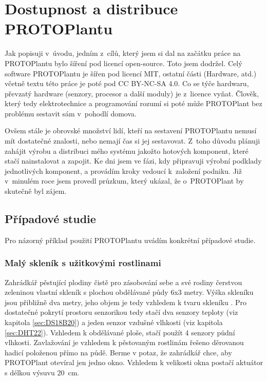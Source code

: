 \chapter{Dostupnost a distribuce PROTOPlantu}
Jak popisuji v~úvodu, jedním z~cílů, který jsem si dal na začátku práce na PROTOPlantu bylo šíření pod licencí open-source.
Toto jsem dodržel. 
Celý software PROTOPlantu je šířen pod licencí MIT, ostatní části (Hardware, atd.) včetně textu této práce je poté pod CC BY-NC-SA 4.0.
Co se týče hardwaru, převzatý hardware (senzory, procesor a další moduly) je z~licence vyňat.
Člověk, který tedy elektrotechnice a programování rozumí si poté může PROTOPlant bez problému sestavit sám v~pohodlí domova.

Ovšem stále je obrovské množství lidí, kteří na sestavení PROTOPlantu nemusí mít dostatečné znalosti, nebo nemají čas si jej sestavovat.
Z~toho důvodu plánuji zahájit výrobu a distribuci mého systému jakožto hotových komponent, které stačí nainstalovat a zapojit.
Ke dni  jsem ve fázi, kdy připravuji výrobní podklady jednotlivých komponent, a provádím kroky vedoucí k~založení podniku.
Již v~minulém roce jsem provedl průzkum, který ukázal, že o~PROTOPlant by skutečně byl zájem.

\section{Případové studie}
Pro názorný příklad použití PROTOPlantu uvádím konkrétní případové studie.

\subsection{Malý skleník s užitkovými rostlinami}
Zahrádkář pěstující plodiny čistě pro zásobování sebe a své rodiny čerstvou zeleninou vlastní skleník s plochou obdělávané půdy 6x3 metry.
Výška skleníku jsou přibližně dva metry, jeho objem je tedy vzhledem k tvaru skleníku .
Pro dostatečné pokrytí prostoru senzorikou tedy stačí dva senzory teploty (viz kapitola \ref{sec:DS18B20}) a jeden senzor vzdušné vlhkosti (viz kapitola \ref{sec:DHT22}). 
Vzhledem k obdělávané ploše, stačí použít 4 senzory půdní vlhkosti.
Zavlažování je vzhledem k pěstovaným rostlinám řešeno děrovanou hadicí položenou přímo na půdě.
Berme v potaz, že zahrádkář chce, aby PROTOPlant otevíral jen jedno okno.
Vzhledem k velikosti okna postačí aktuátor s délkou výsuvu 20~cm.


